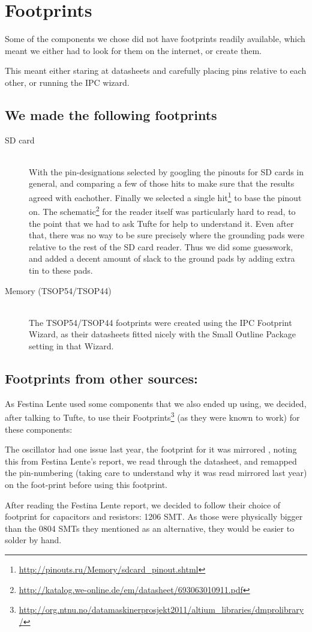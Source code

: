 \section {Footprints}
Some of the components we chose did not have footprints readily available, which
meant we either had to look for them on the internet, or create them.

This meant either staring at datasheets and carefully placing pins
relative to each other, or running the IPC wizard.

\subsection{We made the following footprints}

\begin{description}
\item[SD card] \hfill
\\
  With the pin-designations selected by googling the pinouts for
  \ac{SD} cards in general, and comparing a few of those hits to make sure that
  the results agreed with eachother. Finally we selected a single hit\footnote{\url{http://pinouts.ru/Memory/sdcard_pinout.shtml}}
  to base the pinout on. The
  schematic\footnote{\url{http://katalog.we-online.de/em/datasheet/693063010911.pdf}}
  for the reader itself was particularly hard to read, to the point that we had to ask Tufte
  for help to understand it. Even after that, there was no way to be sure
  precisely where the grounding pads were relative to the rest of the \ac{SD}
  card reader. Thus we did some guesswork, and added a decent amount
  of slack to the ground pads by adding extra tin to these pads.
\item[Memory (TSOP54/TSOP44)] \hfill
\\
  The TSOP54/TSOP44 footprints were created using
  the IPC Footprint Wizard, as their datasheets fitted nicely with the Small
  Outline Package setting in that Wizard.
\end{description}

\subsection{Footprints from other sources:}
As Festina Lente used some components that we also ended up using, we decided,
after talking to Tufte, to use their Footprints\footnote{\url{http://org.ntnu.no/datamaskinerprosjekt2011/altium_libraries/dmprolibrary/}}
(as they were known to work) for these components:


The oscillator had one issue last year, the footprint for it was mirrored
, noting this from Festina Lente's report, we read
through the datasheet, and remapped the pin-numbering (taking care to understand
why it was read mirrored last year) on the foot-print 
before using this footprint.

After reading the Festina Lente report\cite{berg2011festinalente}, we decided to
follow their choice of footprint for capacitors and resistors: 1206 SMT. As
those were physically bigger than the 0804 SMTs they mentioned as an
alternative, they would be easier to solder by hand.
